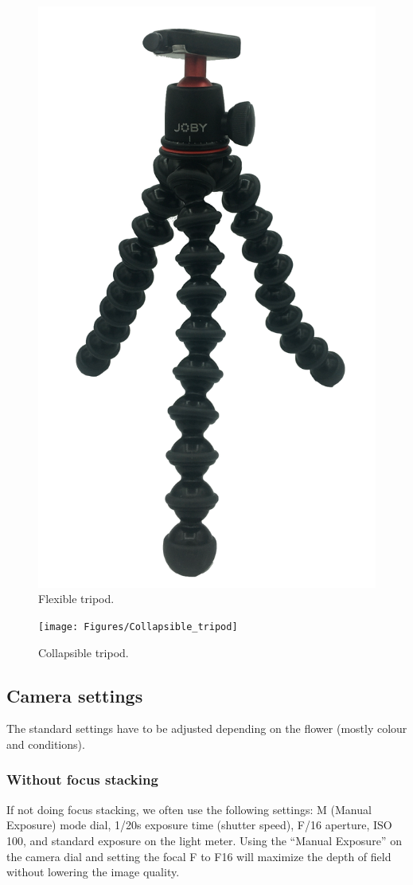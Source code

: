 \documentclass[
]{book}
\begin{document}
\begin{figure}

{\centering \includegraphics[width=0.33\linewidth]{Figures/tripod} 

}

\caption{Flexible tripod.}\label{fig:flexible-tripod}
\end{figure}

\begin{figure}

{\centering \texttt{[image: Figures/Collapsible\_tripod]} 

}

\caption{Collapsible tripod.}\label{fig:collapsible-tripod}
\end{figure}

\hypertarget{camera-settings}{%
\subsection{Camera settings}\label{camera-settings}}

The standard settings have to be adjusted depending on the flower (mostly colour and conditions).

\hypertarget{without-focus-stacking}{%
\subsubsection{Without focus stacking}\label{without-focus-stacking}}

If not doing focus stacking, we often use the following settings: M (Manual Exposure) mode dial,
1/20s exposure time (shutter speed), F/16 aperture, ISO 100, and standard
exposure on the light meter. Using the ``Manual Exposure'' on the camera dial and
setting the focal F to F16 will maximize the depth of field without lowering the image quality.
\end{document}
